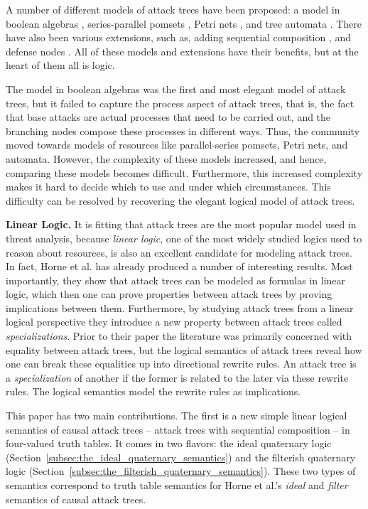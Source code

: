 \documentclass{llncs}
\begin{document}
A number of different models of attack trees have been proposed: a
model in boolean algebras
\cite{Kordy:2014,Kordy:2012,Pietre-Cambacedes:2010}, series-parallel
pomsets \cite{Mauw:2006}, Petri nets \cite{McDermott:2001}, and tree
automata \cite{Camtepe:2007}.  There have also been various
extensions, such as, adding sequential composition \cite{Jhawar:2015},
and defense nodes \cite{Kordy:2011,Kordy:2012}.  All of these models
and extensions have their benefits, but at the heart of them all is
logic.

The model in boolean algebras was the first and most elegant model of
attack trees, but it failed to capture the process aspect of attack
trees, that is, the fact that base attacks are actual processes that
need to be carried out, and the branching nodes compose these
processes in different ways.  Thus, the community moved towards models
of resources like parallel-series pomsets, Petri nets, and automata.
However, the complexity of these models increased, and hence,
comparing these models becomes difficult. Furthermore, this increased
complexity makes it hard to decide which to use and under which
circumstances.  This difficulty can be resolved by recovering the
elegant logical model of attack trees.

\textbf{Linear Logic.}  It is fitting that attack trees are the most
popular model used in threat analysis, because \emph{linear logic},
one of the most widely studied logics used to reason about resources,
is also an excellent candidate for modeling attack trees.  In fact,
Horne et al.\cite{horne2017semantics} has already produced a number of
interesting results.  Most importantly, they show that attack trees
can be modeled as formulas in linear logic, which then one can prove
properties between attack trees by proving implications between them.
Furthermore, by studying attack trees from a linear logical
perspective they introduce a new property between attack trees called
\emph{specializations}.  Prior to their paper the literature was
primarily concerned with equality between attack trees, but the
logical semantics of attack trees reveal how one can break these
equalities up into directional rewrite rules.  An attack tree is a
\emph{specialization} of another if the former is related to the later
via these rewrite rules.  The logical semantics model the rewrite
rules as implications.

This paper has two main contributions. The first is a new simple
linear logical semantics of causal attack trees -- attack trees with
sequential composition -- in four-valued truth tables.  It comes in
two flavors: the ideal quaternary logic
(Section~\ref{subsec:the_ideal_quaternary_semantics}) and the
filterish quaternary logic
(Section~\ref{subsec:the_filterish_quaternary_semantics}).  These two
types of semantics correspond to truth table semantics for Horne et
al.'s\cite{horne2017semantics} \emph{ideal} and \emph{filter}
semantics of causal attack trees.
\end{document}
